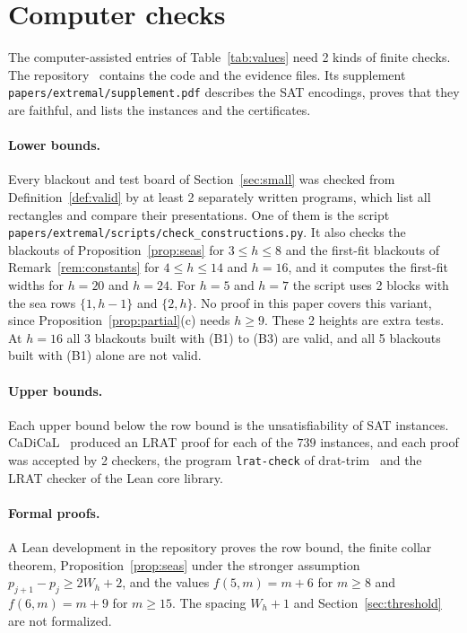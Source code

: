 \section{Computer checks}\label{sec:verify}

The computer-assisted entries of Table~\ref{tab:values} need 2 kinds of finite checks. The
repository~\cite{repo} contains the code and the evidence files. Its supplement
\nolinkurl{papers/extremal/supplement.pdf} describes the SAT encodings, proves that they
are faithful, and lists the instances and the certificates.

\paragraph{Lower bounds.} Every blackout and test board of Section~\ref{sec:small}
was checked from Definition~\ref{def:valid} by at least 2 separately written
programs, which list all rectangles and compare their presentations. One of them is the
script \nolinkurl{papers/extremal/scripts/check_constructions.py}. It also checks the
blackouts of Proposition~\ref{prop:seas} for $3\le h\le8$ and the first-fit blackouts of
Remark~\ref{rem:constants} for $4\le h\le14$ and $h=16$, and it computes the first-fit
widths for $h=20$ and $h=24$. For $h=5$ and $h=7$ the script uses 2 blocks with the sea rows $\{1,h-1\}$ and $\{2,h\}$.
No proof in this paper covers this variant, since Proposition~\ref{prop:partial}(c) needs
$h\ge9$. These 2 heights are extra tests. At $h=16$ all 3 blackouts built with (B1) to (B3) are valid, and all 5 blackouts
built with (B1) alone are not valid.

\paragraph{Upper bounds.} Each upper bound below the row bound is the unsatisfiability of
SAT instances. CaDiCaL~\cite{biere2024} produced an LRAT proof for each of the $739$
instances, and each proof was accepted by 2 checkers, the program \texttt{lrat-check} of
drat-trim~\cite{cruzfilipe2017,wetzler2014} and the LRAT checker of the Lean core library.

\paragraph{Formal proofs.} A Lean development in the repository proves the row bound, the
finite collar theorem, Proposition~\ref{prop:seas} under the stronger assumption
$p_{j+1}-p_j\ge2W_h+2$, and the values $f(5,m)=m+6$ for $m\ge8$ and $f(6,m)=m+9$ for
$m\ge15$. The spacing $W_h+1$ and Section~\ref{sec:threshold} are not formalized.
